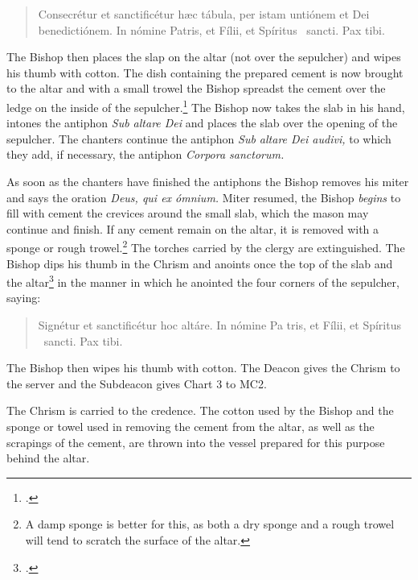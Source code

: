 \documentclass[letterpaper]{report}
\begin{document}
{\begin{quote}
    Conse\cross crétur et sancti\cross ficétur h\ae c tábula, per istam
    untiónem et Dei benedictiónem. In nómine Pa\cross tris, et Fí\cross lii, et
    Spíritus \cross\ sancti. Pax tibi.
\end{quote}

\rubric The Bishop then places the slap on the altar (not over the sepulcher)
and wipes his thumb with cotton. The dish containing the prepared cement is now
brought to the altar and with a small trowel the Bishop spreadst the cement
over the ledge on the inside of the sepulcher.\footcite[The bishop may be
assisted by the mason, and care should be taken that the cement does not fall
on the sack containing the relics.][footnote 1, p. 89.]{consecranda} The Bishop
now takes the slab in his hand, intones the antiphon \textit{Sub altare Dei}
and places the slab over the opening of the sepulcher. The chanters continue
the antiphon \textit{Sub altare Dei audivi,} to which they add, if necessary,
the antiphon \textit{Corpora sanctorum.}

\rubric As soon as the chanters have finished the antiphons the Bishop removes
his miter and says the oration \textit{Deus, qui ex ómnium.} Miter resumed, the
Bishop \textit{begins} to fill with cement the crevices around the small slab,
which the mason may continue and finish. If any cement remain on the altar, it
is removed with a sponge or rough trowel.\footnote{A damp sponge is better for
this, as both a dry sponge and a rough trowel will tend to scratch the surface
of the altar.} The torches carried by the clergy are extinguished. The Bishop
dips his thumb in the Chrism and anoints once the top of the slab and the
altar\footcite[Martinucci, Hartmann, etc., say that the cross should be made
not only on the slab, but also on the portions of the table of the altar near
the slab as indicated by the cut.][footnote 1, p. 90.]{consecranda} in the
manner in which he anointed the four corners of the sepulcher, saying:

\begin{quote}
    Signé\cross tur et sancti\cross ficétur hoc altáre. In nómine Pa\cross
    tris, et Fí\cross lii, et Spíritus \cross\ sancti. Pax tibi.
\end{quote}

The Bishop then wipes his thumb with cotton. The Deacon gives the Chrism to the
server and the Subdeacon gives Chart 3 to MC2.

The Chrism is carried to the credence. The cotton used by the Bishop and the
sponge or towel used in removing the cement from the altar, as well as the
scrapings of the cement, are thrown into the vessel prepared for this purpose
behind the altar.

}
\end{document}
